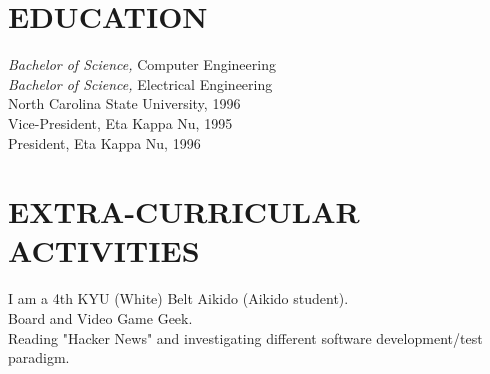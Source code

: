 \documentclass[line,margin]{res}
\begin{document}
\begin{resume}
\section{EDUCATION} {\sl Bachelor of Science,} Computer Engineering \\
                    {\sl Bachelor of Science,} Electrical Engineering \\
                North Carolina State University, 1996 \\
                Vice-President, Eta Kappa Nu, 1995 \\ 
                President, Eta Kappa Nu, 1996 \\

\section{EXTRA-CURRICULAR ACTIVITIES}             
             I am a 4th KYU (White) Belt Aikido (Aikido student). \\
             Board and Video Game Geek. \\
             Reading "Hacker News" and investigating different software development/test paradigm.

\end{resume}
\end{document}
